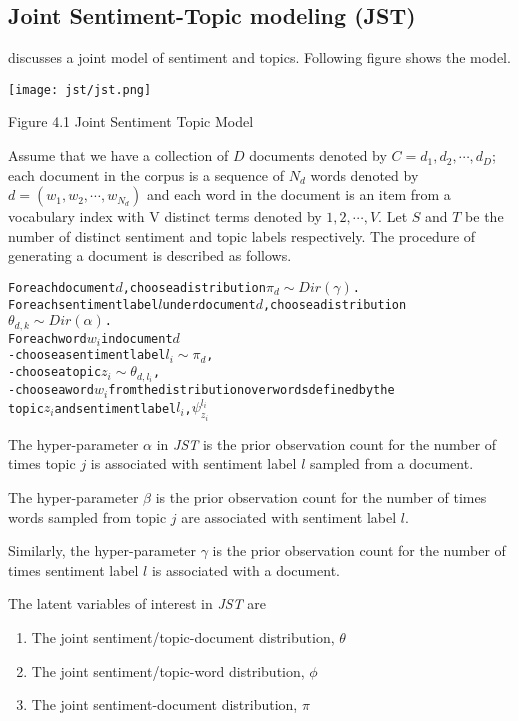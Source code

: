 \subsection{Joint Sentiment-Topic modeling (JST)}

\citep*{lin2009joint} discusses a joint model of sentiment and topics. Following figure shows the model.

\texttt{[image: jst/jst.png]} 
\begin{center}
 Figure 4.1 Joint Sentiment Topic Model
\end{center}

Assume that we have a collection of \(D\) documents denoted by \(C = {d_1,d_2,\cdots,d_D} \); each document in the corpus is a sequence of \(N_d\) words denoted by 
\(d = (w_1,w_2,\cdots,w_{N_d}) \) and each word in the document is an item from a vocabulary index with V distinct terms denoted by \({1,2,\cdots,V}\). Let \(S\) and 
\(T\) be the number of distinct sentiment and topic labels respectively. The procedure of generating a document is described as follows.

\begin{alltt}
For each document \(d\), choose a distribution \(\pi_d \sim Dir(\gamma)\).
For each sentiment label \(l\) under document \(d\), choose a distribution
\(\theta_{d,k} \sim Dir(\alpha)\).
For each word \(w_i\) in document \(d\)
  - choose a sentiment label \(l_i \sim \pi_d\),
  - choose a topic \(z_i \sim \theta_{d,l_i}\),
  - choose a word \(w_i\) from the distribution over words defined by the 
    topic \(z_i\) and sentiment label \(l_i\), \(\psi_{z_i}^{l_i}\)
\end{alltt}

The hyper-parameter \(\alpha\) in \textit{JST} is the prior observation count for the number of times topic \(j\) is associated with  sentiment label \(l\) sampled from
a document. 

The hyper-parameter \(\beta\) is the prior observation count for the number of times words sampled from topic \(j\) are associated with sentiment label \(l\).

Similarly, the hyper-parameter \(\gamma\) is the prior observation count for the number of times sentiment label \(l\) is associated with a document.

The latent variables of interest in \textit{JST} are
\begin{enumerate}
 \item The joint sentiment/topic-document distribution, \(\theta\)
 \item The joint sentiment/topic-word distribution, \(\phi\)
 \item The joint sentiment-document distribution, \(\pi\)
\end{enumerate}

